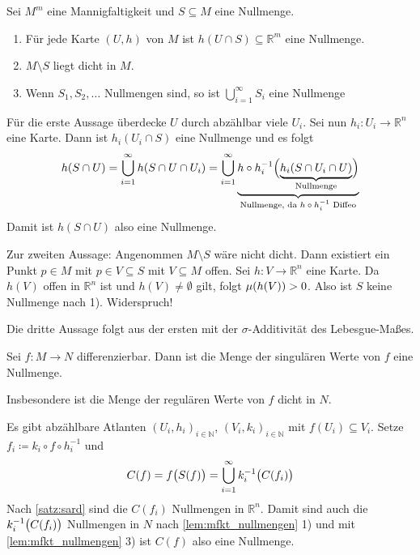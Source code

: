 \begin{lemma}[label=lem:mfkt_nullmengen]
	Sei $M^m$ eine Mannigfaltigkeit und $S \subseteq M$ eine Nullmenge.
	\begin{enumerate}[1)]
		\item Für jede Karte $(U,h)$ von $M$ ist $h(U \cap S) \subseteq \mathbb{R}^m$ eine Nullmenge.
		\item $M\setminus S$ liegt dicht in $M$.
		\item Wenn $S_1, S_2, \ldots $ Nullmengen sind, so ist $\bigcup_{i=1}^\infty S_i$ eine Nullmenge
	\end{enumerate}
\end{lemma}
\begin{beweis}
	Für die erste Aussage überdecke $U$ durch abzählbar viele $U_i$.
	Sei nun $h_i \colon U_i \to \mathbb{R}^n$ eine Karte.
	Dann ist $h_i(U_i \cap S)$ eine Nullmenge und es folgt
	\[
		h(S \cap U) = \bigcup_{i=1}^\infty h \enbrace*{S \cap U \cap U_i} = \bigcup_{i=1}^\infty \Underbrace{h \circ h_i^{-1} \enbrace[\Big]{\Underbrace{h_i \enbrace*{S \cap U_i \cap U}}{\text{Nullmenge}}}}{\text{Nullmenge, da $h \circ h_i^{-1}$ Diffeo}}
	\]
	Damit ist $h(S \cap U)$ also eine Nullmenge.
	
	Zur zweiten Aussage: Angenommen $M \setminus S$ wäre nicht dicht.
	Dann existiert ein Punkt $p \in M$ mit $p \in V \subseteq S$ mit $V \subseteq M$ offen.
	Sei $h \colon V \to \mathbb{R}^n$ eine Karte.
	Da $h(V)$ offen in $\mathbb{R}^n$ ist und $h(V) \neq \emptyset$ gilt, folgt $\mu \enbrace*{h(V)}>0$.
	Also ist $S$ keine Nullmenge nach 1). Widerspruch!
	
	Die dritte Aussage folgt aus der ersten mit der $\sigma$-Additivität des Lebesgue-Maßes.
\end{beweis}

\begin{satz}[{name={Sard, globale Version}}]
	Sei $f \colon M \to N$ differenzierbar.
	Dann ist die Menge der singulären Werte von $f$ eine Nullmenge.
	
	Insbesondere ist die Menge der regulären Werte von $f$ dicht in $N$.
\end{satz}
\begin{beweis}
	Es gibt abzählbare Atlanten $(U_i,h_i)_{i \in \mathbb{N}}$, $(V_i,k_i)_{i \in \mathbb{N}}$ mit $f(U_i) \subseteq V_i$.
	Setze $f_i \coloneqq k_i \circ f \circ h_i^{-1}$ und 
	\[
		C(f) = f \enbrace[\big]{S(f)} = \bigcup_{i=1}^\infty k_i^{-1} \enbrace[\big]{C(f_i)}
	\]
	Nach \cref{satz:sard} sind die $C(f_i)$ Nullmengen in $\mathbb{R}^n$.
	Damit sind auch die $k_i^{-1}\enbrace[\big]{C(f_i)}$ Nullmengen in $N$ nach \cref{lem:mfkt_nullmengen} 1) und mit \cref{lem:mfkt_nullmengen} 3) ist $C(f)$ also eine Nullmenge.
\end{beweis}

